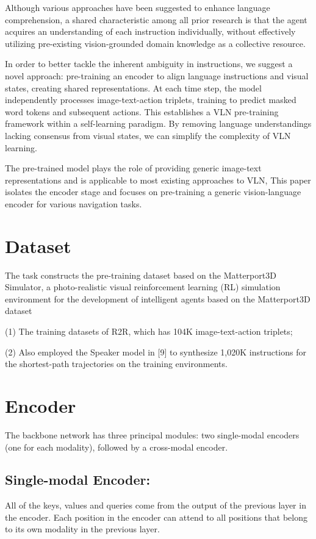\documentclass{article}
\begin{document}
Although various approaches have been suggested to enhance language comprehension, a shared characteristic among all prior research is that the agent acquires an understanding of each instruction individually, without effectively utilizing pre-existing vision-grounded domain knowledge as a collective resource.

In order to better tackle the inherent ambiguity in instructions, we suggest a novel approach: pre-training an encoder to align language instructions and visual states, creating shared representations. At each time step, the model independently processes image-text-action triplets, training to predict masked word tokens and subsequent actions. This establishes a VLN pre-training framework within a self-learning paradigm. By removing language understandings lacking consensus from visual states, we can simplify the complexity of VLN learning.

The pre-trained model plays the role of providing generic image-text representations and is applicable to most existing approaches to VLN, This paper isolates the encoder stage and focuses on pre-training a generic vision-language encoder for various navigation tasks.

\section{Dataset}
The task constructs the pre-training dataset based on the Matterport3D Simulator, a photo-realistic visual reinforcement learning (RL) simulation environment for the development of intelligent agents based on the Matterport3D dataset

(1) The training datasets of R2R, which has 104K image-text-action triplets;

(2) Also employed the Speaker model in [9] to synthesize 1,020K instructions for the shortest-path trajectories on the training environments.

\section{Encoder}    
The backbone network has three principal modules: two single-modal encoders (one for each modality), followed by a cross-modal encoder.
\subsection{ Single-modal Encoder:} 
 All of the keys, values and queries come from the output of the previous layer in the encoder. Each position in the encoder can attend to all positions that belong to its own modality in the previous layer.
\end{document}
